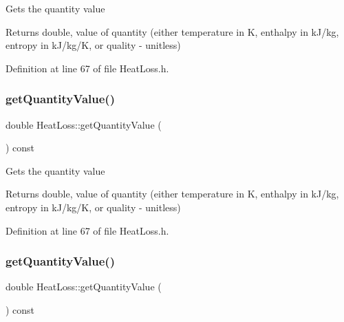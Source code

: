 Gets the quantity value \begin{DoxyReturn}{Returns}
double, value of quantity (either temperature in K, enthalpy in k\+J/kg, entropy in k\+J/kg/K, or quality -\/ unitless) 
\end{DoxyReturn}


Definition at line 67 of file Heat\+Loss.\+h.

\mbox{\label{class_heat_loss_a7f7fd85e4fc8bf96dcc213f3dd44ecf7}} 
\subsubsection{\texorpdfstring{get\+Quantity\+Value()}{getQuantityValue()}\hspace{0.1cm}{\footnotesize\ttfamily [2/3]}}
{\footnotesize\ttfamily double Heat\+Loss\+::get\+Quantity\+Value (\begin{DoxyParamCaption}{ }\end{DoxyParamCaption}) const\hspace{0.3cm}{\ttfamily [inline]}}

Gets the quantity value \begin{DoxyReturn}{Returns}
double, value of quantity (either temperature in K, enthalpy in k\+J/kg, entropy in k\+J/kg/K, or quality -\/ unitless) 
\end{DoxyReturn}


Definition at line 67 of file Heat\+Loss.\+h.

\mbox{\label{class_heat_loss_a7f7fd85e4fc8bf96dcc213f3dd44ecf7}} 
\subsubsection{\texorpdfstring{get\+Quantity\+Value()}{getQuantityValue()}\hspace{0.1cm}{\footnotesize\ttfamily [3/3]}}
{\footnotesize\ttfamily double Heat\+Loss\+::get\+Quantity\+Value (\begin{DoxyParamCaption}{ }\end{DoxyParamCaption}) const\hspace{0.3cm}{\ttfamily [inline]}}

